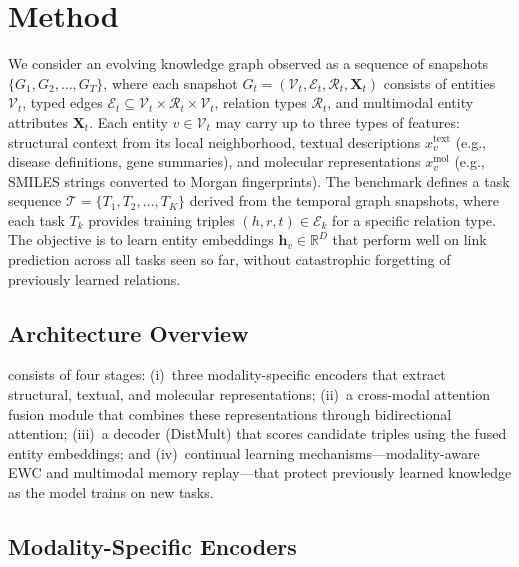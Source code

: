 \section{Method}
\label{sec:method}

We consider an evolving knowledge graph observed as a sequence of snapshots $\{G_1, G_2, \ldots, G_T\}$, where each snapshot $G_t = (\mathcal{V}_t, \mathcal{E}_t, \mathcal{R}_t, \mathbf{X}_t)$ consists of entities $\mathcal{V}_t$, typed edges $\mathcal{E}_t \subseteq \mathcal{V}_t \times \mathcal{R}_t \times \mathcal{V}_t$, relation types $\mathcal{R}_t$, and multimodal entity attributes $\mathbf{X}_t$.
Each entity $v \in \mathcal{V}_t$ may carry up to three types of features: structural context from its local neighborhood, textual descriptions $x_v^{\text{text}}$ (e.g., disease definitions, gene summaries), and molecular representations $x_v^{\text{mol}}$ (e.g., SMILES strings converted to Morgan fingerprints).
The benchmark defines a task sequence $\mathcal{T} = \{T_1, T_2, \ldots, T_K\}$ derived from the temporal graph snapshots, where each task $T_k$ provides training triples $(h, r, t) \in \mathcal{E}_k$ for a specific relation type.
The objective is to learn entity embeddings $\mathbf{h}_v \in \mathbb{R}^D$ that perform well on link prediction across all tasks seen so far, without catastrophic forgetting of previously learned relations.

\subsection{Architecture Overview}
\label{subsec:overview}

\ours consists of four stages: (i)~three modality-specific encoders that extract structural, textual, and molecular representations; (ii)~a cross-modal attention fusion module that combines these representations through bidirectional attention; (iii)~a decoder (DistMult) that scores candidate triples using the fused entity embeddings; and (iv)~continual learning mechanisms---modality-aware EWC and multimodal memory replay---that protect previously learned knowledge as the model trains on new tasks.

\subsection{Modality-Specific Encoders}
\label{subsec:encoders}

